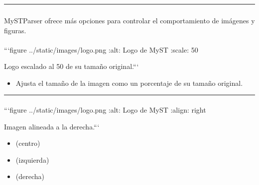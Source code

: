 \documentclass[a4paper,10pt,spanish]{sphinxmanual}
\begin{document}
\bigskip\hrule\bigskip



\subsubsection{}
\label{\detokenize{configuracion_inicial/013.guia_de_myst_parser:opciones-avanzadas-para-imagenes-y-figuras}}
\sphinxAtStartPar
MyST\sphinxhyphen{}Parser ofrece más opciones para controlar el comportamiento de imágenes y figuras.


\paragraph{}
\label{\detokenize{configuracion_inicial/013.guia_de_myst_parser:escalar-imagenes}}
\begin{sphinxVerbatim}[commandchars=\\\{\}]
  ```\PYGZob{}figure\PYGZcb{} ../\PYGZus{}static/images/logo.png
  :alt: Logo de MyST
  :scale: 50\PYGZpc{}

  Logo escalado al 50\PYGZpc{} de su tamaño original.```
\end{sphinxVerbatim}
\begin{itemize}
\item {} 
\sphinxAtStartPar
{} Ajusta el tamaño de la imagen como un porcentaje de su tamaño original.

\end{itemize}


\bigskip\hrule\bigskip



\paragraph{}
\label{\detokenize{configuracion_inicial/013.guia_de_myst_parser:alinear-imagenes}}
\begin{sphinxVerbatim}[commandchars=\\\{\}]
  ```\PYGZob{}figure\PYGZcb{} ../\PYGZus{}static/images/logo.png
  :alt: Logo de MyST
  :align: right

  Imagen alineada a la derecha.```
\end{sphinxVerbatim}
\begin{itemize}
\item {} 
\sphinxAtStartPar
{} (centro)

\item {} 
\sphinxAtStartPar
{} (izquierda)

\item {} 
\sphinxAtStartPar
{} (derecha)

\end{itemize}
\end{document}
